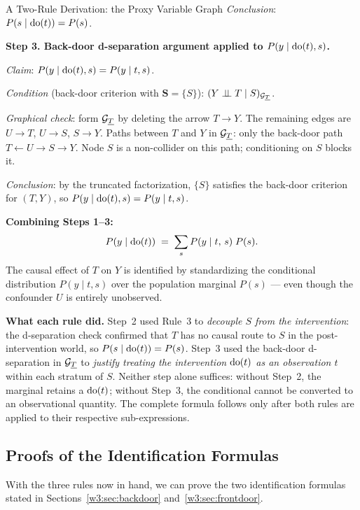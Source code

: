 \documentclass[master.tex]{subfiles}
\begin{document}
\begin{example}{A Two-Rule Derivation: the Proxy Variable Graph}
\emph{Conclusion}: $P(s \mid \mathrm{do}(t)) = P(s)$.

\medskip
\noindent\textbf{Step 3.  Back-door d-separation argument applied to
$P(y \mid \mathrm{do}(t), s)$.}

\emph{Claim}: $P(y \mid \mathrm{do}(t), s) = P(y \mid t, s)$.

\emph{Condition} (back-door criterion with $\mathbf{S}=\{S\}$):
$(Y \perp\!\!\!\perp T \mid S)_{\mathcal{G}_{\underline{T}}}$.

\emph{Graphical check}: form $\mathcal{G}_{\underline{T}}$ by deleting the
arrow $T \to Y$.  The remaining edges are $U \to T$, $U \to S$, $S \to Y$.
Paths between $T$ and $Y$ in $\mathcal{G}_{\underline{T}}$: only the back-door
path $T \leftarrow U \to S \to Y$.  Node $S$ is a non-collider on this
path; conditioning on $S$ blocks it. \checkmark

\emph{Conclusion}: by the truncated factorization, $\{S\}$ satisfies the
back-door criterion for $(T, Y)$, so $P(y \mid \mathrm{do}(t), s) = P(y \mid t, s)$.

\medskip
\noindent\textbf{Combining Steps 1--3:}
\[
  P(y \mid \mathrm{do}(t))
  \;=\; \sum_s P(y \mid t,\,s)\;P(s).
\]
The causal effect of $T$ on $Y$ is identified by standardizing the
conditional distribution $P(y \mid t, s)$ over the population marginal
$P(s)$ --- even though the confounder $U$ is entirely unobserved.

\medskip
\noindent\textbf{What each rule did.}
Step~2 used Rule~3 to \emph{decouple $S$ from the intervention}: the
d-separation check confirmed that $T$ has no causal route to $S$ in the
post-intervention world, so $P(s \mid \mathrm{do}(t)) = P(s)$.
Step~3 used the back-door d-separation in $\mathcal{G}_{\underline{T}}$ to
\emph{justify treating the intervention $\mathrm{do}(t)$ as an observation $t$}
within each stratum of $S$.  Neither step alone suffices: without
Step~2, the marginal retains a $\mathrm{do}(t)$; without Step~3, the
conditional cannot be converted to an observational quantity.
The complete formula follows only after both rules are applied to
their respective sub-expressions.
\end{example}

\subsection{Proofs of the Identification Formulas}
\label{w3:sec:proofs}
With the three rules now in hand, we can prove the two identification
formulas stated in Sections~\ref{w3:sec:backdoor}
and~\ref{w3:sec:frontdoor}.
\end{document}
